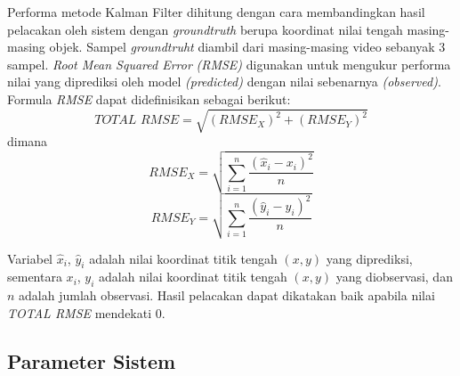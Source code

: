\begin{enumerate}
            Performa metode Kalman Filter dihitung dengan cara membandingkan hasil pelacakan oleh sistem dengan \textit{groundtruth} berupa koordinat nilai tengah masing-masing objek. Sampel \textit{groundtruht} diambil dari masing-masing video sebanyak 3 sampel. \textit{Root Mean Squared Error} \textit{(RMSE)} digunakan untuk mengukur performa nilai yang diprediksi oleh  model \textit{(predicted)} dengan nilai sebenarnya \textit{(observed)}. Formula \textit{RMSE} dapat didefinisikan sebagai berikut: 
            \begin{equation}\label{eq:3.8}
            \textit{TOTAL RMSE} = \sqrt{(RMSE_X)^2 + (RMSE_Y)^2}
            \end{equation}
            dimana
            \begin{equation}\label{eq:3.9}
            RMSE_X = \sqrt{\sum_{i = 1}^n  \frac{(\hat{x}_i - x_i)^2}{n}}
            \end{equation}
            \begin{equation}\label{eq:3.10}
            RMSE_Y = \sqrt{\sum_{i = 1}^n  \frac{(\hat{y}_i - y_i)^2}{n}}
            \end{equation}
            
            Variabel $\hat{x}_i$, $\hat{y}_i$ adalah nilai koordinat titik tengah $(x, y)$ yang diprediksi, sementara $x_i$, $y_i$ adalah nilai koordinat titik tengah $(x, y)$ yang diobservasi, dan $n$ adalah jumlah observasi. Hasil pelacakan dapat dikatakan baik apabila nilai \textit{TOTAL RMSE} mendekati 0.
        \end{enumerate}
    
    \subsection{Parameter Sistem}
    
